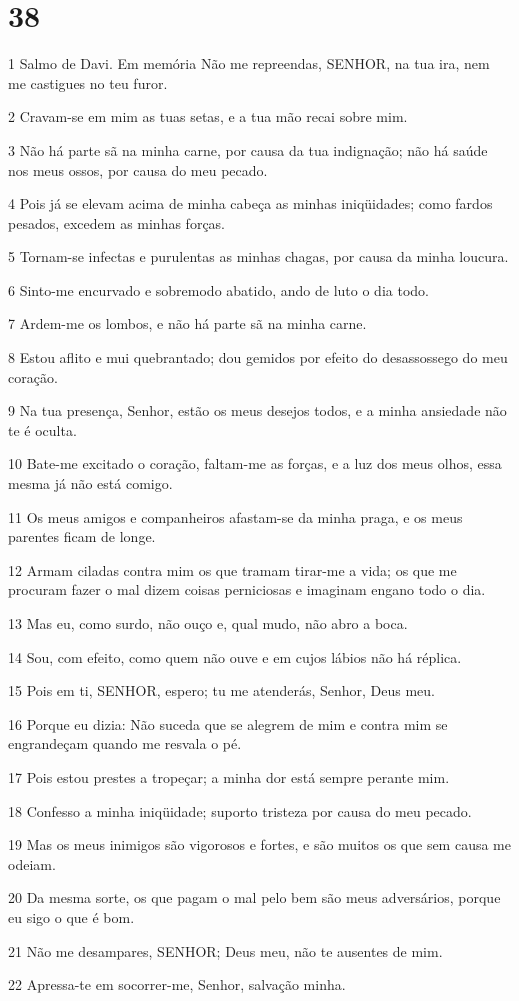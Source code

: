 \chapter{38}

\par 1 Salmo de Davi. Em memória Não me repreendas, SENHOR, na tua ira, nem me castigues no teu furor.
\par 2 Cravam-se em mim as tuas setas, e a tua mão recai sobre mim.
\par 3 Não há parte sã na minha carne, por causa da tua indignação; não há saúde nos meus ossos, por causa do meu pecado.
\par 4 Pois já se elevam acima de minha cabeça as minhas iniqüidades; como fardos pesados, excedem as minhas forças.
\par 5 Tornam-se infectas e purulentas as minhas chagas, por causa da minha loucura.
\par 6 Sinto-me encurvado e sobremodo abatido, ando de luto o dia todo.
\par 7 Ardem-me os lombos, e não há parte sã na minha carne.
\par 8 Estou aflito e mui quebrantado; dou gemidos por efeito do desassossego do meu coração.
\par 9 Na tua presença, Senhor, estão os meus desejos todos, e a minha ansiedade não te é oculta.
\par 10 Bate-me excitado o coração, faltam-me as forças, e a luz dos meus olhos, essa mesma já não está comigo.
\par 11 Os meus amigos e companheiros afastam-se da minha praga, e os meus parentes ficam de longe.
\par 12 Armam ciladas contra mim os que tramam tirar-me a vida; os que me procuram fazer o mal dizem coisas perniciosas e imaginam engano todo o dia.
\par 13 Mas eu, como surdo, não ouço e, qual mudo, não abro a boca.
\par 14 Sou, com efeito, como quem não ouve e em cujos lábios não há réplica.
\par 15 Pois em ti, SENHOR, espero; tu me atenderás, Senhor, Deus meu.
\par 16 Porque eu dizia: Não suceda que se alegrem de mim e contra mim se engrandeçam quando me resvala o pé.
\par 17 Pois estou prestes a tropeçar; a minha dor está sempre perante mim.
\par 18 Confesso a minha iniqüidade; suporto tristeza por causa do meu pecado.
\par 19 Mas os meus inimigos são vigorosos e fortes, e são muitos os que sem causa me odeiam.
\par 20 Da mesma sorte, os que pagam o mal pelo bem são meus adversários, porque eu sigo o que é bom.
\par 21 Não me desampares, SENHOR; Deus meu, não te ausentes de mim.
\par 22 Apressa-te em socorrer-me, Senhor, salvação minha.

